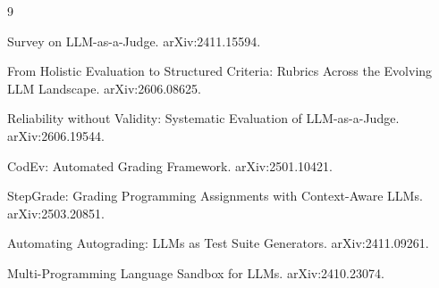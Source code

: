 \documentclass[a4paper,12pt]{report}
\begin{document}
\begin{thebibliography}{9}

Survey on LLM-as-a-Judge. arXiv:2411.15594.

From Holistic Evaluation to Structured Criteria: Rubrics Across the
Evolving LLM Landscape. arXiv:2606.08625.

Reliability without Validity: Systematic Evaluation of LLM-as-a-Judge.
arXiv:2606.19544.

CodEv: Automated Grading Framework. arXiv:2501.10421.

StepGrade: Grading Programming Assignments with Context-Aware LLMs.
arXiv:2503.20851.

Automating Autograding: LLMs as Test Suite Generators. arXiv:2411.09261.

Multi-Programming Language Sandbox for LLMs. arXiv:2410.23074.

\end{thebibliography}
\end{document}
